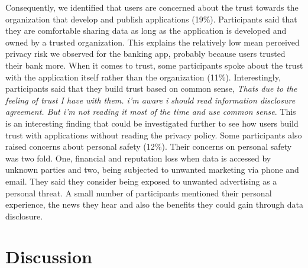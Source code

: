 \documentclass[10pt]{article}
\begin{document}
Consequently, we identified that users are concerned about the trust towards the organization that develop and publish applications (19\%). Participants said that they are comfortable sharing data as long as the application is developed and owned by a trusted organization. This explains the relatively low mean perceived privacy risk we observed for the banking app, probably because users trusted their bank more. When it comes to trust, some participants spoke about the trust with the application itself rather than the organization (11\%). Interestingly, participants said that they build trust based on common sense, \textit {Thats due to the feeling of trust I have with them. i'm aware i should read information disclosure agreement. But i'm not reading it most of the time and use common sense}. This is an interesting finding that could be investigated further to see how users build trust with applications without reading the privacy policy. Some participants also raised concerns about personal safety (12\%). Their concerns on personal safety was two fold. One, financial and reputation loss when data is accessed by unknown parties and two, being subjected to unwanted marketing via phone and email. They said they consider being exposed to unwanted advertising as a personal threat. A small number of participants mentioned their personal experience, the news they hear and also the benefits they could gain through data disclosure.

\section {Discussion}
\end{document}
